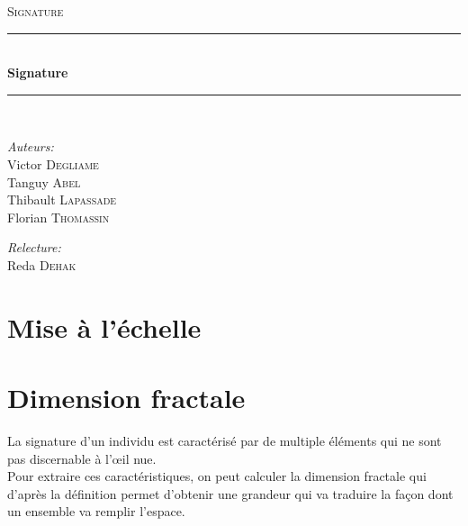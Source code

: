 \documentclass[pdftex,12pt,a4paper]{report}
\newcommand{\HRule}{\rule{\linewidth}{0.5mm}}
\begin{document}
\begin{titlepage}
\begin{center}
\textsc{\LARGE Signature}\\[1.5cm]

\HRule \\[0.4cm]
{\huge \bfseries Signature}\\[0.4cm]
\HRule \\[1.5cm]
\end{center}

\begin{minipage}{0.4\textwidth}
	\begin{flushleft} \large
		\emph{Auteurs:}\\
			Victor \textsc{Degliame} \\
			Tanguy \textsc{Abel} \\
			Thibault \textsc{Lapassade} \\
			Florian \textsc{Thomassin} \\
	\end{flushleft}
\end{minipage}
\begin{minipage}{0.4\textwidth}
	\begin{flushright} \large
		\emph{Relecture:} \\
              Reda \textsc{Dehak}
	\end{flushright}
\end{minipage}
\end{titlepage}

\tableofcontents

\newpage

\chapter{Mise à l’échelle}

\newpage

\chapter{Dimension fractale}
La signature d'un individu est caractérisé par de multiple éléments qui ne sont pas discernable à l'œil nue.\\

Pour extraire ces caractéristiques, on peut calculer la dimension fractale qui d'après la définition permet d'obtenir une grandeur qui va traduire la façon dont un ensemble va remplir l'espace.\\
\end{document}
